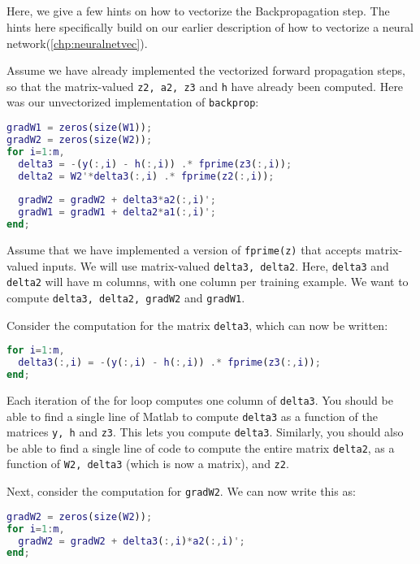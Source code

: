 \subsection{} \label{chp:backpropvechints}

Here, we give a few hints on how to vectorize the Backpropagation step. The hints here specifically build on our earlier description of how to vectorize a neural network(\ref{chp:neuralnetvec}).

Assume we have already implemented the vectorized forward propagation steps, so that the matrix-valued \texttt{z2, a2, z3} and \texttt{h} have already been computed. Here was our unvectorized implementation of \texttt{backprop}:
\begin{lstlisting}[language=matlab]
gradW1 = zeros(size(W1));
gradW2 = zeros(size(W2)); 
for i=1:m,
  delta3 = -(y(:,i) - h(:,i)) .* fprime(z3(:,i)); 
  delta2 = W2'*delta3(:,i) .* fprime(z2(:,i));
 
  gradW2 = gradW2 + delta3*a2(:,i)';
  gradW1 = gradW1 + delta2*a1(:,i)'; 
end;
\end{lstlisting}

Assume that we have implemented a version of \texttt{fprime(z)} that accepts matrix-valued inputs. We will use matrix-valued \texttt{delta3, delta2}. Here, \texttt{delta3} and \texttt{delta2} will have m columns, with one column per training example. We want to compute \texttt{delta3, delta2, gradW2} and \texttt{gradW1}.

Consider the computation for the matrix \texttt{delta3}, which can now be written:
\begin{lstlisting}[language=matlab]
for i=1:m, 
  delta3(:,i) = -(y(:,i) - h(:,i)) .* fprime(z3(:,i)); 
end;
\end{lstlisting}

Each iteration of the for loop computes one column of \texttt{delta3}. You should be able to find a single line of Matlab to compute \texttt{delta3} as a function of the matrices \texttt{y, h} and \texttt{z3}. This lets you compute \texttt{delta3}. Similarly, you should also be able to find a single line of code to compute the entire matrix \texttt{delta2}, as a function of \texttt{W2, delta3} (which is now a matrix), and \texttt{z2}.

Next, consider the computation for \texttt{gradW2}. We can now write this as:
\begin{lstlisting}[language=matlab]
gradW2 = zeros(size(W2));
for i=1:m, 
  gradW2 = gradW2 + delta3(:,i)*a2(:,i)';
end;
\end{lstlisting}

